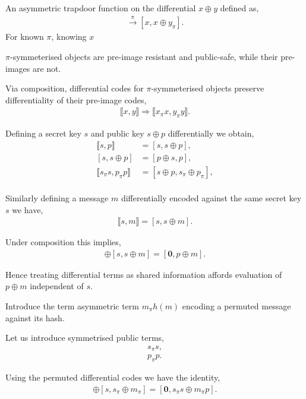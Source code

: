 \documentclass[twocolumn, aps, amsmath, amssymb, nofootinbib, superscriptaddress, longbibliography, doublefloatfix, table-of-contents, eqsecnum, rmp]{revtex4-2}
\def\diff#1#2{\llbracket #1,#2\rrbracket}
\begin{document}
An asymmetric trapdoor function on the differential $x\oplus y$ defined as,
\begin{align}
	[x,x\oplus y] \xrightarrow{\pi} [x, x \oplus y_\pi].
\end{align}
For known $\pi$, knowing $x$

$\pi$-symmeterised objects are pre-image resistant and public-safe, while their pre-images are not.

Via composition, differential codes for $\pi$-symmeterised objects preserve differentiality of their pre-image codes,
\begin{align}
	\diff{x}{y} \Rightarrow \diff{x_\pi x}{y_\pi y}.
\end{align}

Defining a secret key $s$ and public key $s\oplus p$ differentially we obtain,
\begin{align}
	\diff{s}{p} &= [s, s\oplus p],\nonumber\\
	[s, s\oplus p] &= [p\oplus s, p],\nonumber\\
	\diff{s_\pi s}{p_\pi p} &= [s\oplus p, s_\pi\oplus p_\pi],\nonumber\\
\end{align}

Similarly defining a message $m$ differentially encoded against the same secret key $s$ we have,
\begin{align}
	\diff{s}{m} = [s,s\oplus m].
\end{align}

Under composition this implies,
\begin{align}
	[s,s\oplus p] \oplus [s,s\oplus m] = [\mathbf{0},p\oplus m].	
\end{align}

Hence treating differential terms as shared information affords evaluation of $p\oplus m$ independent of $s$.

Introduce the term asymmetric term $m_\pi h(m)$ encoding a permuted message against its hash.


Let us introduce symmetrised public terms,
\begin{align}
	s_\pi s, \nonumber\\
	p_\pi p.	
\end{align}

Using the permuted differential codes we have the identity,
\begin{align}
	[s,s \oplus p] \oplus [s, s_\pi \oplus m_\pi] = [\mathbf{0}, s_\pi s \oplus m_\pi p].
\end{align}
\end{document}
